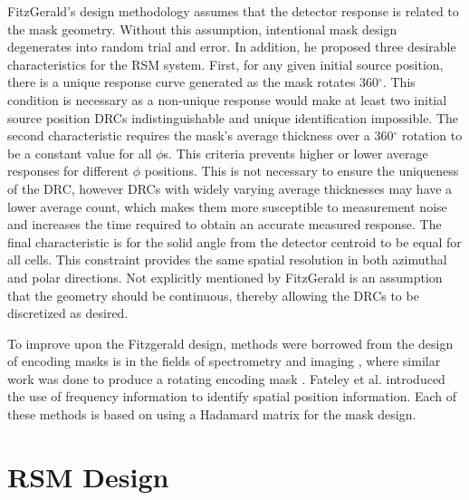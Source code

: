 \documentclass[3p,times]{elsarticle}
\begin{document}
FitzGerald's design methodology assumes that the detector response is related to the mask geometry.  
Without this assumption, intentional mask design degenerates into random trial and error.
In addition, he proposed three desirable characteristics for the RSM system.  
First, for any given initial source position, there is a unique response curve generated as the mask rotates 360$^\circ$.  
This condition is necessary as a non-unique response would make at least two initial source position DRCs indistinguishable and unique identification impossible.
The second characteristic requires the mask's average thickness over a 360$^\circ$ rotation to be a constant value for all $\phi$s.  
This criteria prevents higher or lower average responses for different $\phi$ positions. 
This is not necessary to ensure the uniqueness of the DRC, however DRCs with widely varying average thicknesses may have a lower average count, which makes them more susceptible to measurement noise and increases the time required to obtain an accurate measured response.
The final characteristic is for the solid angle from the detector centroid to be equal for all cells.  
This constraint provides the same spatial resolution in both azimuthal and polar directions.
Not explicitly mentioned by FitzGerald is an assumption that the geometry should be continuous, thereby allowing the DRCs to be discretized as desired.

To improve upon the Fitzgerald design, methods were borrowed from the design of encoding masks is in the fields of spectrometry and imaging \cite{Sloane76, Finger85, Hanley00, DeVerse00}, where similar work was done to produce a rotating encoding mask \cite{Bellamy97}.
Fateley et al.\cite{Fateley00} introduced the use of frequency information to identify spatial position information.
Each of these methods is based on using a Hadamard matrix for the mask design.

\section{RSM Design}
\end{document}

